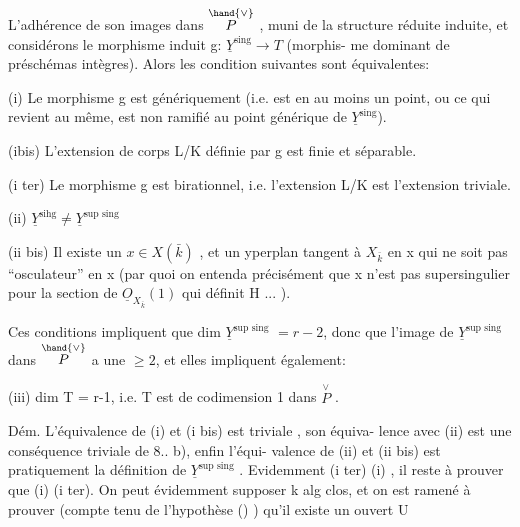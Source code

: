 
L'adhérence de son images dans $\overset{\hand{\vee}}{P}$ , muni de la structure réduite
induite, et considérons le morphisme induit g: $\underline{Y}^{\text{sing}} \longrightarrow T$  (morphis-%
me dominant de préschémas  intègres). Alors les condition
 suivantes sont équivalentes:

(i) Le morphisme g est génériquement   (i.e. est   en au moins un point, ou ce qui revient au même, est  non ramifié
au point générique de $\underline{Y}^{\text{sing}}$).

(ibis) L'extension de corps L/K définie par g est finie et
séparable.

(i ter) Le morphisme g est birationnel, i.e. l'extension L/K est
l'extension triviale.

(ii) $\underline{Y}^{\text{sihg}} \neq \underline{Y}^{\text{sup sing}}$ 

(ii bis) Il existe un $x \in X(\bar{k})$ , et un yperplan tangent  à $X_{\bar{k}}$
en x qui ne soit pas ``osculateur'' en x (par quoi on entenda précisément
que x n'est pas supersingulier pour la section de $\underline{O}_{X_{\bar{k}}}(1)$ qui définit
H ... ).

Ces conditions impliquent que  dim $\underline{Y}^{\text{sup sing}}$ \deleted{$\leq$}$= r-2$, donc que
l'image de $\underline{Y}^{\text{sup sing}}$ dans $\overset{\hand{\vee}}{P}$ a une  $\geqslant 2$, et  elles impliquent
également:

(iii) dim T = r-1, i.e. T est de codimension 1 dans $\overset{\vee}{P}$ .

Dém. L'équivalence de (i) et (i bis) est triviale , son équiva-%
lence avec (ii) est une conséquence triviale de 8.. b), enfin l'équi-%
valence de (ii) et (ii bis) est pratiquement la définition de
$\underline{Y}^{\text{sup sing}}$ . Evidemment (i ter) \hand{$\Longrightarrow$}(i) , il reste à prouver que (i)\hand{$\Longrightarrow$}
(i ter). On peut évidemment supposer k alg clos, et on est ramené à
prouver (compte tenu de l'hypothèse () ) qu'il existe un ouvert U\hand{$\neq\emptyset$}

